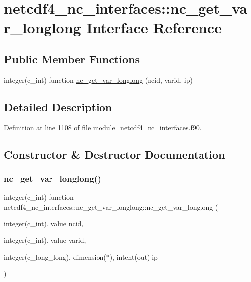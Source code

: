 \hypertarget{interfacenetcdf4__nc__interfaces_1_1nc__get__var__longlong}{}\section{netcdf4\+\_\+nc\+\_\+interfaces\+:\+:nc\+\_\+get\+\_\+var\+\_\+longlong Interface Reference}
\label{interfacenetcdf4__nc__interfaces_1_1nc__get__var__longlong}
\subsection*{Public Member Functions}
\begin{DoxyCompactItemize}
\item 
integer(c\+\_\+int) function \hyperlink{interfacenetcdf4__nc__interfaces_1_1nc__get__var__longlong_a78a6abe542c5134a51e638b9ac49d0ff}{nc\+\_\+get\+\_\+var\+\_\+longlong} (ncid, varid, ip)
\end{DoxyCompactItemize}


\subsection{Detailed Description}


Definition at line 1108 of file module\+\_\+netcdf4\+\_\+nc\+\_\+interfaces.\+f90.



\subsection{Constructor \& Destructor Documentation}
\mbox{\label{interfacenetcdf4__nc__interfaces_1_1nc__get__var__longlong_a78a6abe542c5134a51e638b9ac49d0ff}} 
\subsubsection{\texorpdfstring{nc\+\_\+get\+\_\+var\+\_\+longlong()}{nc\_get\_var\_longlong()}}
{\footnotesize\ttfamily integer(c\+\_\+int) function netcdf4\+\_\+nc\+\_\+interfaces\+::nc\+\_\+get\+\_\+var\+\_\+longlong\+::nc\+\_\+get\+\_\+var\+\_\+longlong (\begin{DoxyParamCaption}\item[{integer(c\+\_\+int), value}]{ncid,  }\item[{integer(c\+\_\+int), value}]{varid,  }\item[{integer(c\+\_\+long\+\_\+long), dimension($\ast$), intent(out)}]{ip }\end{DoxyParamCaption})}



